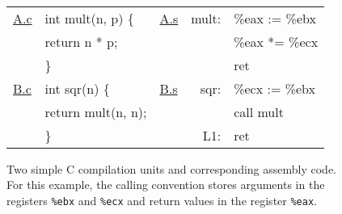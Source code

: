 \documentclass[sigplan,10pt,review]{acmart}
\newcommand{\figsize}{\small}
\begin{document}
\begin{figure} %
  \figsize
  \tt
  \begin{tabular}{ll lr@{\ }l}
    \hline
    \underline{A.c} & int mult(n, p) \{ &
    \underline{A.s} & mult: & \%eax := \%ebx \\
                    & \quad return n * p; &
                    & & \%eax *= \%ecx \\
                    & \} &
                    & & ret \\
    \hline
    \underline{B.c} & int sqr(n) \{ &
    \underline{B.s} & sqr: & \%ecx := \%ebx \\
                    & \quad return mult(n, n); &
                    & & call mult \\
                    & \} &
                    & L1: & ret \\
    \hline
  \end{tabular}
  \caption{Two simple C compilation units and corresponding assembly code.
    For this example,
    the calling convention stores arguments in
    the registers
    \texttt{\%ebx} and \texttt{\%ecx}
    and return values in
    the register
    \texttt{\%eax}.}
  \label{fig:abc}
\end{figure}


\end{document}
